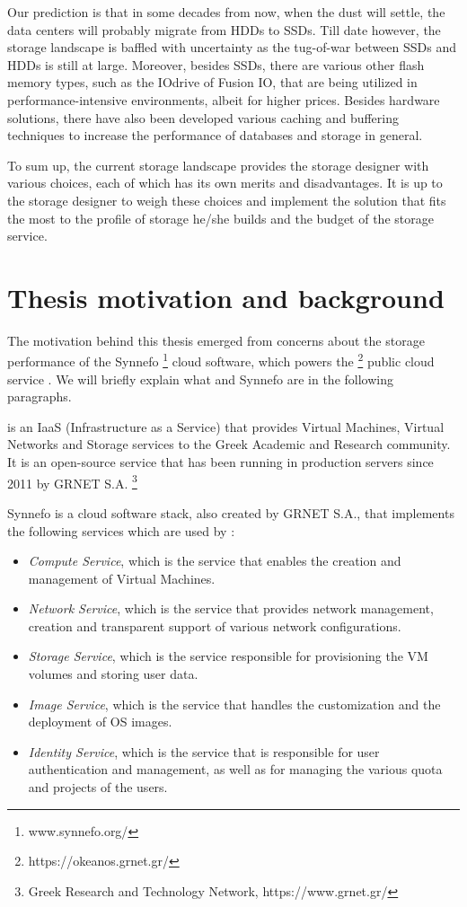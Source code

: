Our prediction is that in some decades from now, when the dust will settle, the 
data centers will probably migrate from HDDs to SSDs. Till date however, the 
storage landscape is baffled with uncertainty as the tug-of-war between SSDs 
and HDDs is still at large. Moreover, besides SSDs, there are various other 
flash memory types, such as the IOdrive of Fusion IO, that are being utilized 
in performance-intensive environments, albeit for higher prices. Besides 
hardware solutions, there have also been developed various caching and 
buffering techniques to increase the performance of databases and storage in 
general.

To sum up, the current storage landscape provides the storage designer with 
various choices, each of which has its own merits and disadvantages. It is up 
to the storage designer to weigh these choices and implement the solution that 
fits the most to the profile of storage he/she builds and the budget of the 
storage service.

\section{Thesis motivation and background}

The motivation behind this thesis emerged from concerns about the storage 
performance of the Synnefo
\footnote{www.synnefo.org/} cloud software, which powers the \okeanos
\footnote{https://okeanos.grnet.gr/} public cloud service \cite{okeanos}. We 
will briefly explain what \okeanos and Synnefo are in the following paragraphs.

\okeanos is an IaaS (Infrastructure as a Service) that provides Virtual 
Machines, Virtual Networks and Storage services to the Greek Academic and 
Research community. It is an open-source service that has been running in 
production servers since 2011 by GRNET S.A.
\footnote{Greek Research and Technology Network, https://www.grnet.gr/}

Synnefo\cite{synnefo} is a cloud software stack, also created by GRNET S.A., 
that implements the following services which are used by \okeanos:

\begin{itemize}
	\item \textit{Compute Service}, which is the service that enables the 
		creation and management of Virtual Machines.
	\item \textit{Network Service}, which is the service that provides network 
		management, creation and transparent support of various network 
		configurations.
	\item \textit{Storage Service}, which is the service responsible for 
		provisioning the VM volumes and storing user data.
	\item \textit{Image Service}, which is the service that handles the 
		customization and the deployment of OS images.
	\item \textit{Identity Service}, which is the service that is responsible 
		for user authentication and management, as well as for managing the 
		various quota and projects of the users.
\end{itemize}

